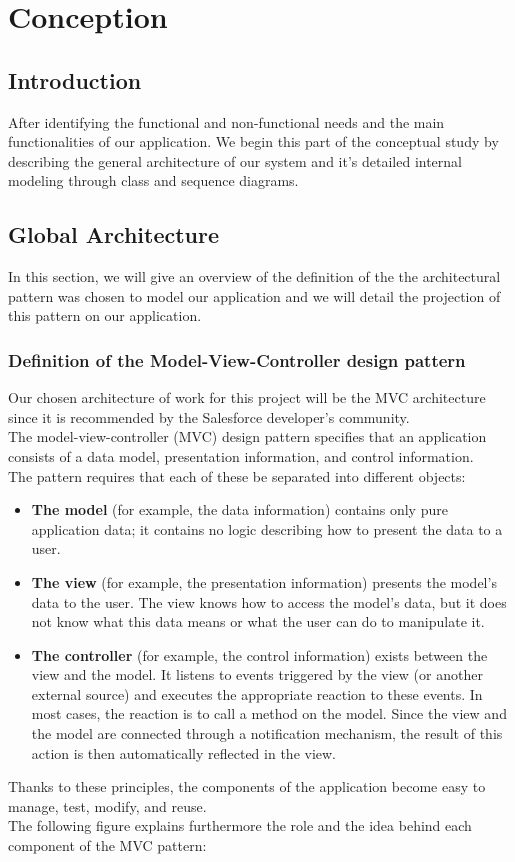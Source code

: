 \chapter{Conception}
\section*{Introduction}
After identifying the functional and non-functional needs and the main functionalities of our application. We begin this part
of the conceptual study by describing the general architecture of our system and
it's detailed internal modeling through class and sequence diagrams.
\section{Global Architecture}
In this section, we will give an overview of the definition of the
the architectural pattern was chosen to model our application and we will
detail the projection of this pattern on our application.

\subsection{Definition of the Model-View-Controller design pattern}
Our chosen architecture of work for this project will be the MVC  architecture since it is recommended by the Salesforce developer’s community.\\
The model-view-controller (MVC) design pattern specifies that an application consists of a data model, presentation information, and control information.\cite{5} \\
The pattern requires that each of these be separated into different objects:
\begin{itemize}
\item \textbf{The model} (for example, the data information) contains only pure application data; it contains no logic describing how to present the data to a user. \cite{5}
\item \textbf{The view} (for example, the presentation information) presents the model's data to the user. The view knows how to access the model's data, but it does not know what this data means or what the user can do to manipulate it. \cite{5}
\item \textbf{The controller} (for example, the control information) exists between the view and the model. It listens to events triggered by the view (or another external source) and executes the appropriate reaction to these events. In most cases, the reaction is to call a method on the model. Since the view and the model are connected through a notification mechanism, the result of this action is then automatically reflected in the view.\cite{5}
\end{itemize}
Thanks to these principles, the components of the application become easy to
manage, test, modify, and reuse.\\
The following figure explains furthermore the role and the idea behind each component of the MVC pattern:


